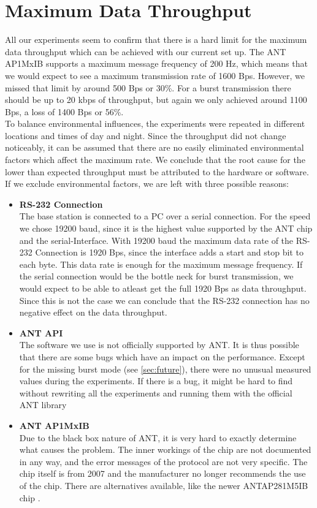 \section{Maximum Data Throughput}
\label{sec:dataThrougput}

All our experiments seem to confirm that there is a hard limit for the maximum data throughput which can be achieved with our current set up. The ANT AP1MxIB supports a maximum message frequency of 200 Hz, which means that we would expect to see a maximum transmission rate of 1600 Bps.
 However, we missed that limit by around 500 Bps or 30\%. For a burst transmission there should be up to 20 kbps of throughput, but again we only achieved around 1100 Bps, a loss of 1400 Bps or 56\%.\\
To balance environmental influences, the experiments were repeated in different locations and times of day and night. Since the throughput did not change noticeably, it can be assumed that there are no easily eliminated environmental factors which affect the maximum rate. We conclude that the root cause for the lower than expected throughput must be attributed to the hardware or software. \\

If we exclude environmental factors, we are left with three possible reasons:
\begin{itemize}
	\item{\textbf{RS-232 Connection}} \hfill \\ The base station is connected to a PC over a serial connection. For the speed we chose 19200 baud, since it is the highest value supported by the ANT chip and the serial-Interface. With 19200 baud the maximum data rate of the RS-232 Connection is 1920 Bps, since the interface adds a start and stop bit to each byte. This data rate is enough for the maximum message frequency. If the serial connection would be the bottle neck for burst transmission, we would expect to be able to atleast get the full 1920 Bps as data throughput. Since this is not the case we can conclude that the RS-232 connection has no negative effect on the data throughput.

	\item{\textbf{ANT API}} \hfill \\ The software we use is not officially supported by ANT. It is thus possible that there are some bugs which have an impact on the performance. Except for the missing burst mode (see \ref{sec:future}), there were no unusual measured values during the experiments. If there is a bug, it might be hard to find without rewriting all the experiments and running them with the official ANT library \cite{ANTWinLib}
	
	\item{\textbf{ANT AP1MxIB}} \hfill \\ Due to the black box nature of ANT, it is very hard to exactly determine what causes the problem. The inner workings of the chip are not documented in any way, and the error messages of the protocol are not very specific. The chip itself is from 2007 and the manufacturer no longer recommends the use of the chip\cite{AP1page}. There are alternatives available, like the newer ANTAP281M5IB chip \cite{AP2Datasheet}.
\end{itemize}
\newpage